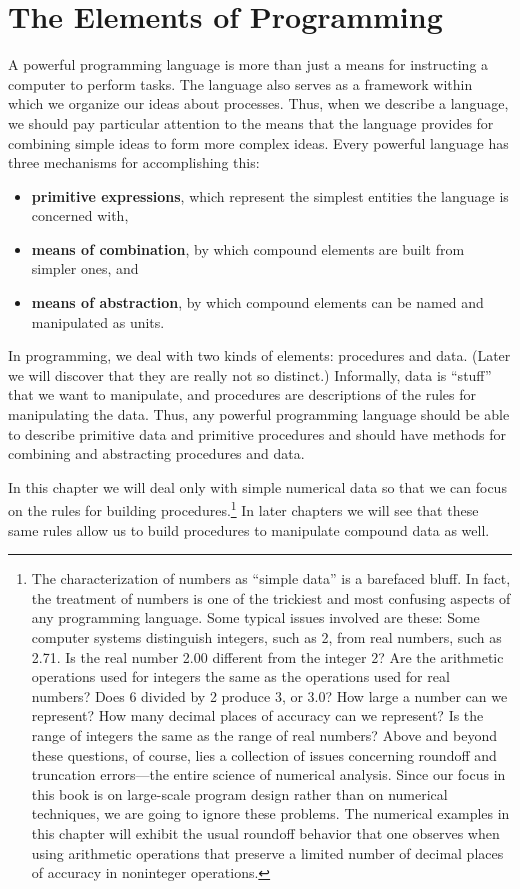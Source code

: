 \section{The Elements of Programming}

A powerful programming language is more than just a means for instructing a computer to perform tasks. The language also serves as a framework within which we organize our ideas about processes. Thus, when we describe a language, we should pay particular attention to the means that the language provides for combining simple ideas to form more complex ideas. Every powerful language has three mechanisms for accomplishing this:

\begin{itemize}
\item \textbf{primitive expressions}, which represent the simplest entities the language is concerned with,
\item \textbf{means of combination}, by which compound elements are built from simpler ones, and
\item \textbf{means of abstraction}, by which compound elements can be named and manipulated as units.
\end{itemize}

In programming, we deal with two kinds of elements: procedures and data. (Later we will discover that they are really not so distinct.) Informally, data is ``stuff'' that we want to manipulate, and procedures are descriptions of the rules for manipulating the data. Thus, any powerful programming language should be able to describe primitive data and primitive procedures and should have methods for combining and abstracting procedures and data.

In this chapter we will deal only with simple numerical data so that we can focus on the rules for building procedures.\footnote{The characterization of numbers as ``simple data'' is a barefaced bluff. In fact, the treatment of numbers is one of the trickiest and most confusing aspects of any programming language. Some typical issues involved are these: Some computer systems distinguish integers, such as 2, from real numbers, such as 2.71. Is the real number 2.00 different from the integer 2? Are the arithmetic operations used for integers the same as the operations used for real numbers? Does 6 divided by 2 produce 3, or 3.0? How large a number can we represent? How many decimal places of accuracy can we represent? Is the range of integers the same as the range of real numbers? Above and beyond these questions, of course, lies a collection of issues concerning roundoff and truncation errors---the entire science of numerical analysis. Since our focus in this book is on large-scale program design rather than on numerical techniques, we are going to ignore these problems. The numerical examples in this chapter will exhibit the usual roundoff behavior that one observes when using arithmetic operations that preserve a limited number of decimal places of accuracy in noninteger operations.} In later chapters we will see that these same rules allow us to build procedures to manipulate compound data as well.

